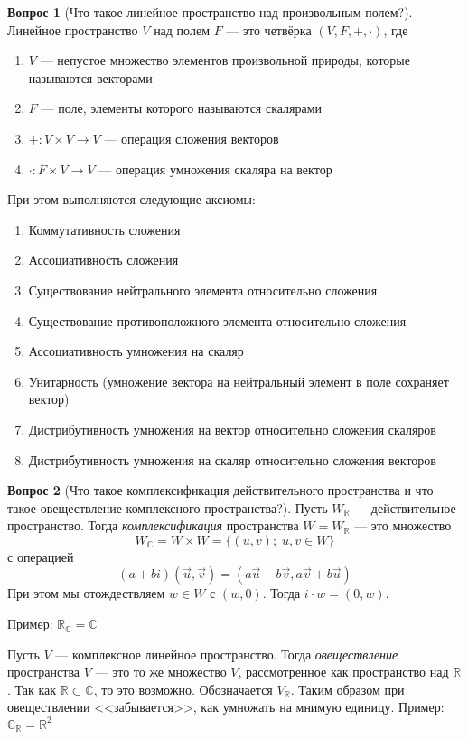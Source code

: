\documentclass[a4paper,11pt]{article}
\theoremstyle{remark}
\theoremstyle{definition}
\newtheorem{question}{Вопрос}
\numberwithin{question}{subsection}
\begin{document}
\begin{question}[Что такое линейное пространство над произвольным полем?]
Линейное пространство \(V\) над полем \(F\) --- это четвёрка \((V, F, +, \cdot)\), где
\begin{enumerate}
	\item \(V\) --- непустое множество элементов произвольной природы, которые называются векторами
	\item \(F\) --- поле, элементы которого называются скалярами
	\item \(+: V \times V \rightarrow V\) --- операция сложения векторов
	\item \(\cdot: F \times V \rightarrow V\) --- операция умножения скаляра на вектор
\end{enumerate}
При этом выполняются следующие аксиомы:
\begin{enumerate}
	\item Коммутативность сложения
	\item Ассоциативность сложения
	\item Существование нейтрального элемента относительно сложения
	\item Существование противоположного элемента относительно сложения
	\item Ассоциативность умножения на скаляр
	\item Унитарность (умножение вектора на нейтральный элемент в поле сохраняет вектор)
	\item Дистрибутивность умножения на вектор относительно сложения скаляров
	\item Дистрибутивность умножения на скаляр относительно сложения векторов
\end{enumerate}
\end{question}


\begin{question}[Что такое комплексификация действительного пространства и что такое овеществление комплексного пространства?]
Пусть \(W_{\mathbb{R}}\) --- действительное пространство. Тогда \emph{комплексификация} пространства \(W = W_{\mathbb{R}}\) --- это множество
\begin{equation*}
	W_{\mathbb{C}} = W \times W = \{(u, v);\;u, v \in W\}
\end{equation*}
с операцией
\begin{equation*}
	(a + bi)(\vec{u}, \vec{v}) = (a\vec{u} - b\vec{v}, a\vec{v} + b\vec{u})
\end{equation*}
При этом мы отождествляем \(w \in W\) с \((w, 0)\). Тогда \(i \cdot w = (0, w)\).

Пример: \(\mathbb{R_C} = \mathbb{C}\)

Пусть \(V\) --- комплексное линейное пространство. Тогда \emph{овеществление} пространства \(V\) --- это то же множество \(V\), рассмотренное как пространство над \(\mathbb{R}\). Так как \(\mathbb{R} \subset \mathbb{C}\), то это возможно. Обозначается \(V_{\mathbb{R}}\).
Таким образом при овеществлении <<забывается>>, как умножать на мнимую единицу.
Пример: \(\mathbb{C}_{\mathbb{R}} = \mathbb{R}^2\)
\end{question}
\end{document}
